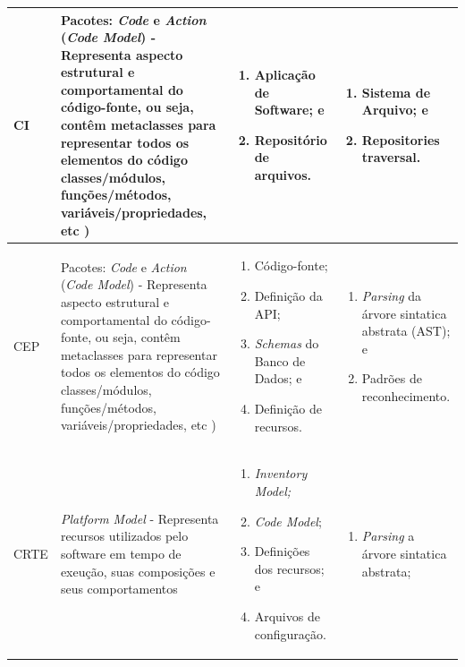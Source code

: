 \begin{longtable}{ | m{2.5cm} | m{5.9cm}| m{3.5cm} | m{3.5cm} | }
 \hline CI & Pacotes: \emph{Code} e \emph{Action} (\emph{Code Model}) \newline - Representa aspecto estrutural e comportamental do código-fonte, ou seja, contêm metaclasses para representar todos os elementos do código classes/módulos, funções/métodos, variáveis/propriedades, etc )  & \begin{enumerate}
  \item Aplicação de Software; e
  \item Repositório de arquivos.
  \end{enumerate} & \begin{enumerate}
  \item Sistema de Arquivo; e
  \item Repositories traversal.
  \end{enumerate} \tabularnewline
\hline CEP & Pacotes: \emph{Code} e \emph{Action} (\emph{Code Model}) \newline - Representa aspecto estrutural e comportamental do código-fonte, ou seja, contêm metaclasses para representar todos os elementos do código classes/módulos, funções/métodos, variáveis/propriedades, etc ) & \begin{enumerate}
 	\item Código-fonte;
 	\item Definição da API;
 	\item \emph{Schemas} do Banco de Dados; e
 	\item Definição de recursos. 
 \end{enumerate} & \begin{enumerate}
 	\item \emph{Parsing} da árvore sintatica abstrata (AST); e
 	\item Padrões de reconhecimento.
 \end{enumerate} \tabularnewline
\hline 
\multirow{4}{2.5cm}{
CRTE
} &  \emph{Platform Model} \newline - Representa recursos utilizados pelo software em tempo de exeução, suas composições e seus comportamentos & \begin{enumerate}
	\item \emph{Inventory Model;}
	\item \emph{Code Model};
	\item Definições dos recursos; e
	\item Arquivos de configuração.
\end{enumerate} & \begin{enumerate}
	\item \emph{Parsing} a árvore sintatica abstrata;

\end{enumerate}
\end{longtable}
